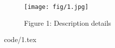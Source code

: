 \documentclass[12pt]{article}
\begin{document}



\newpage

\begin{figure}[h]
\begin {center}
\texttt{[image: fig/1.jpg]}
\caption*{Figure 1: Description details}
\end{center}
\centering
\end{figure}

\begin{algorithm}
\caption{Code Title}
\label{alg:waypointAlgo}
\begin{algorithmic}[1]
{code/1.tex}
\end{algorithmic}
\end{algorithm}
\end{document}
